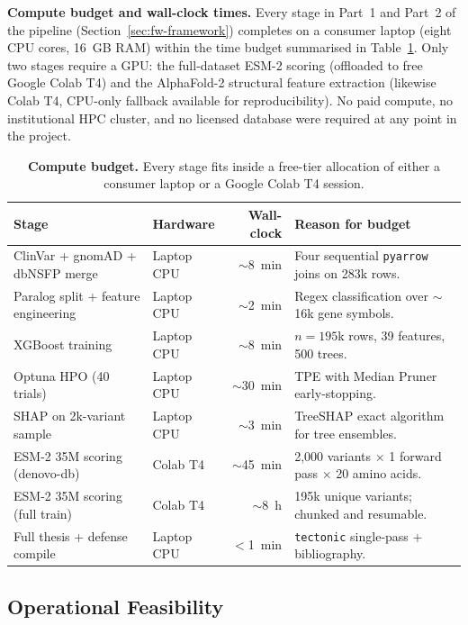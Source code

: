 \documentclass[11pt,a4paper,oneside]{report}
\begin{document}
\textbf{Compute budget and wall-clock times.} Every stage in
Part~1 and Part~2 of the pipeline
(Section~\ref{sec:fw-framework}) completes on a consumer
laptop (eight CPU cores, 16~GB RAM) within the time budget
summarised in Table~\ref{tab:compute-budget}. Only two
stages require a GPU: the full-dataset ESM-2 scoring
(offloaded to free Google Colab T4) and the AlphaFold-2
structural feature extraction (likewise Colab T4, CPU-only
fallback available for reproducibility). No paid compute,
no institutional HPC cluster, and no licensed database were
required at any point in the project.

\begin{table}[htbp]
\centering
\footnotesize
\begin{tabularx}{\linewidth}{@{}l l r X@{}}
\toprule
\textbf{Stage} & \textbf{Hardware} & \textbf{Wall-clock} & \textbf{Reason for budget} \\
\midrule
ClinVar + gnomAD + dbNSFP merge &
Laptop CPU &
$\sim$8~min &
Four sequential \texttt{pyarrow} joins on 283k rows. \\
Paralog split + feature engineering &
Laptop CPU &
$\sim$2~min &
Regex classification over $\sim$16k gene symbols. \\
XGBoost training &
Laptop CPU &
$\sim$8~min &
$n=195$k rows, 39 features, 500 trees. \\
Optuna HPO (40 trials) &
Laptop CPU &
$\sim$30~min &
TPE with Median Pruner early-stopping. \\
SHAP on 2k-variant sample &
Laptop CPU &
$\sim$3~min &
TreeSHAP exact algorithm for tree ensembles. \\
ESM-2 35M scoring (denovo-db) &
Colab T4 &
$\sim$45~min &
2{,}000 variants $\times$ 1 forward pass $\times$ 20 amino acids. \\
ESM-2 35M scoring (full train) &
Colab T4 &
$\sim$8~h &
195k unique variants; chunked and resumable. \\
Full thesis + defense compile &
Laptop CPU &
$<$1~min &
\texttt{tectonic} single-pass + bibliography. \\
\bottomrule
\end{tabularx}
\caption[Compute budget]{\textbf{Compute budget.} Every
stage fits inside a free-tier allocation of either a
consumer laptop or a Google Colab T4 session.}
\label{tab:compute-budget}
\end{table}

\subsection{Operational Feasibility}
\label{sec:feas-op}
\end{document}

